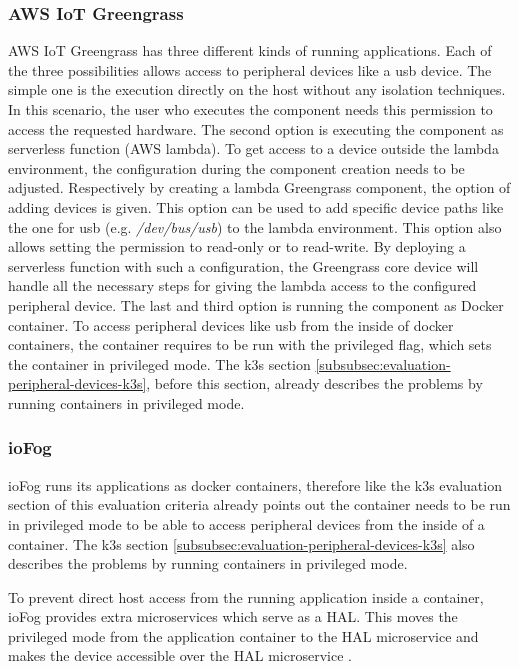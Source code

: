 \subsubsection*{AWS IoT Greengrass}
AWS IoT Greengrass has three different kinds of running applications. Each of the three possibilities allows access to peripheral devices like a \gls{usb} device. The simple one is the execution directly on the host without any isolation techniques. In this scenario, the user who executes the component needs this permission to access the requested hardware. The second option is executing the component as serverless function (AWS lambda). To get access to a device outside the lambda environment, the configuration during the component creation needs to be adjusted. Respectively by creating a lambda Greengrass component, the option of adding devices is given. This option can be used to add specific device paths like the one for \gls{usb} (e.g. \textit{/dev/bus/usb}) to the lambda environment. This option also allows setting the permission to read-only or to read-write. By deploying a serverless function with such a configuration, the Greengrass core device will handle all the necessary steps for giving the lambda access to the configured peripheral device. The last and third option is running the component as Docker container. To access peripheral devices like \gls{usb} from the inside of docker containers, the container requires to be run with the privileged flag, which sets the container in privileged mode. The k3s section \ref{subsubsec:evaluation-peripheral-devices-k3s}, before this section, already describes the problems by running containers in privileged mode.

\subsubsection*{ioFog}
ioFog runs its applications as docker containers, therefore like the k3s evaluation section of this evaluation criteria already points out the container needs to be run in privileged mode to be able to access peripheral devices from the inside of a container. The k3s section \ref{subsubsec:evaluation-peripheral-devices-k3s} also describes the problems by running containers in privileged mode.

\bigskip
To prevent direct host access from the running application inside a container, ioFog provides extra microservices which serve as a \gls{HAL}. This moves the privileged mode from the application container to the \gls{HAL} microservice and makes the device accessible over the \gls{HAL} microservice \cite{ioFogHALMicroservice}.

